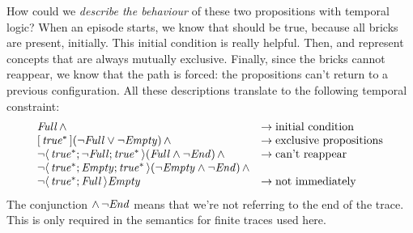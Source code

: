 How could we \emph{describe the behaviour} of these two propositions with
temporal logic? When an episode starts, we know that  should be
true, because all bricks are present, initially. This initial condition is
really helpful. Then,  and  represent concepts that
are always mutually exclusive. Finally, since the bricks cannot reappear, we
know that the path is forced: the propositions can't return to a previous
configuration. All these descriptions translate to the following \ldl{}
temporal constraint:
\begin{equation}
	\begin{array}{ll}
		\const{Full}\, \land &
		\to \text{initial condition}\\
		\lbox{\true^*} (\lnot \const{Full} \lor \lnot \const{Empty})\, \land &
		\to \text{exclusive propositions}\\
		\lnot \ldiamond{\true^*; \lnot \const{Full}; \true^*}
		(\const{Full} \land \lnot \lend)\, \land &
		\to \text{can't reappear}\\
		\lnot \ldiamond{\true^*; \const{Empty}; \true^*}
		(\lnot \const{Empty} \land \lnot \lend)\, \land \\
		\lnot \ldiamond{\true^*; \const{Full}} \const{Empty} &
		\to \text{not immediately}\\
	\end{array}
	\label{eq:breakout-constraint}
\end{equation}
The conjunction $\land\, \neg \text{\textit{End}}$ means that we're not referring to the
end of the trace. This is only required in the \ldl{} semantics for finite
traces used here.

